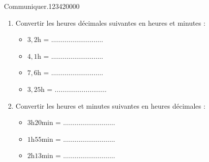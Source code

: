 \begin{pageParcourst}
\begin{ExoCt}{ Communiquer.}{1234}{2}{0}{0}{0}{0}

\begin{enumerate}
 
\item Convertir les heures décimales suivantes en heures et minutes :
 
 \begin{itemize}
\item $3,2$h = $\ldots\ldots\ldots\ldots\ldots\ldots\ldots\ldots\ldots$
\item $4,1$h = $\ldots\ldots\ldots\ldots\ldots\ldots\ldots\ldots\ldots$
\item $7,6$h = $\ldots\ldots\ldots\ldots\ldots\ldots\ldots\ldots\ldots$
\item $3,25$h = $\ldots\ldots\ldots\ldots\ldots\ldots\ldots\ldots\ldots$
\end{itemize}
 
\item  Convertir les heures et minutes suivantes en heures décimales :
 \begin{itemize}
\item $3$h$20$min = $\ldots\ldots\ldots\ldots\ldots\ldots\ldots\ldots\ldots$
\item $1$h$55$min = $\ldots\ldots\ldots\ldots\ldots\ldots\ldots\ldots\ldots$
\item $2$h$13$min = $\ldots\ldots\ldots\ldots\ldots\ldots\ldots\ldots\ldots$
\end{itemize} 

\end{enumerate}

\end{ExoCt}


\end{pageParcourst}


